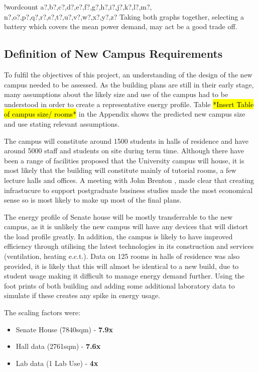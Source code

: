 \documentclass[fontsize=9.5pt]{extarticle}
\numberwithin{figure}{section} %
\providecommand{\tightlist}{%
  \setlength{\itemsep}{0pt}\setlength{\parskip}{0pt}}
\newcounter{words}
\newenvironment{counted}{%
  \setcounter{words}{0}
  \SearchList!{wordcount}{\stepcounter{words}}
    {a?,b?,c?,d?,e?,f?,g?,h?,i?,j?,k?,l?,m?,
    n?,o?,p?,q?,r?,s?,t?,u?,v?,w?,x?,y?,z?}
  \UndoBoundary{'}
  \SearchOrder{p;}}{%
  \StopSearching}
\begin{document}
\begin{counted}
Taking both graphs together, selecting a battery which covers the mean
power demand, may act be a good trade off.

\subsection{Definition of New Campus
Requirements}\label{definition-of-new-campus-requirements}

To fulfil the objectives of this project, an understanding of the design
of the new campus needed to be assessed. As the building plans are still
in their early stage, many assumptions about the likely size and use of
the campus had to be understood in order to create a representative
energy profile. Table \hl{*Insert Table of campus size/ rooms*} in the
Appendix shows the predicted new campus size and use stating relevant
assumptions.

The campus will constitute around 1500 students in halls of residence
and have around 5000 staff and students on site during term time.
Although there have been a range of facilities proposed that the
University campus will house, it is most likely that the building will
constitute mainly of tutorial rooms, a few lecture halls and offices. A
meeting with John Brenton \autocite{Jbrentmeet}, made clear that
creating infrastucure to support postgraduate business studies made the
most economical sense so is most likely to make up most of the final
plans.

The energy profile of Senate house will be mostly transferrable to the
new campus, as it is unlikely the new campus will have any devices that
will distort the load profile greatly. In addition, the campus is likely
to have improved efficiency through utilising the latest technologies in
its construction and services (ventilation, heating e.c.t.). Data on 125
rooms in halls of residence was also provided, it is likely that this
will almost be identical to a new build, due to student usage making it
difficult to manage energy demand further. Using the foot prints of both
building and adding some additional laboratory data to simulate if these
creates any spike in energy usage.

The scaling factors were:

\begin{itemize}
\tightlist
\item
  Senate House (7840sqm) - \textbf{7.9x}
\item
  Hall data (2761sqm) - \textbf{7.6x}
\item
  Lab data (1 Lab Use) - \textbf{4x}
\end{itemize}


\end{counted}
\end{document}
